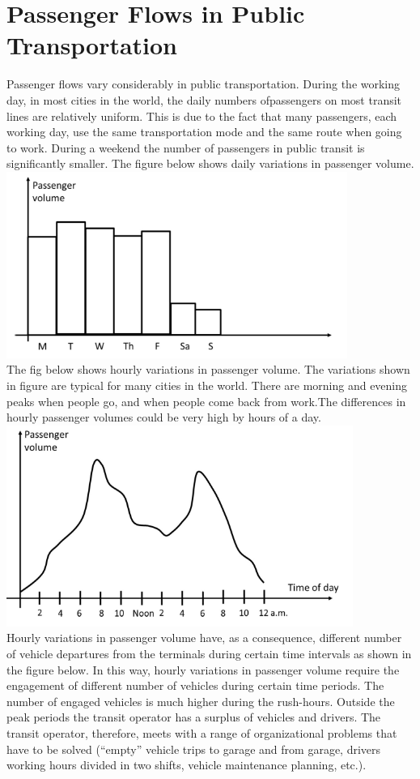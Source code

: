 \section{Passenger Flows in Public Transportation}
Passenger flows vary considerably in public transportation. During the working day, in most cities in the world, the daily numbers ofpassengers on most transit lines are relatively uniform. This is due to the fact that many passengers, each working day, use the same transportation mode and the same route when going to work. During a weekend the number of passengers in public transit is significantly smaller. The figure below shows daily variations in passenger volume.\\
\includegraphics{gfx/fig18.png}\\
The fig below shows hourly variations in passenger volume. The variations shown in figure are typical for many cities in the world. There are morning and evening peaks when people go, and when people come back from work.The differences in hourly passenger volumes could be very high by hours of a day.\\
\includegraphics{gfx/fig19.png}\\
Hourly variations in passenger volume have, as a consequence, different number of vehicle departures from the terminals during certain time intervals as shown in the figure below. In this way, hourly variations in passenger volume require the engagement of different number of vehicles during certain time periods. The number of engaged vehicles is much higher during the rush-hours. Outside the peak periods the transit operator has a surplus of vehicles and drivers. The transit operator, therefore, meets with a range of organizational problems that have to be solved (“empty” vehicle trips to garage and from garage, drivers working hours divided in two shifts, vehicle maintenance planning, etc.).\\
